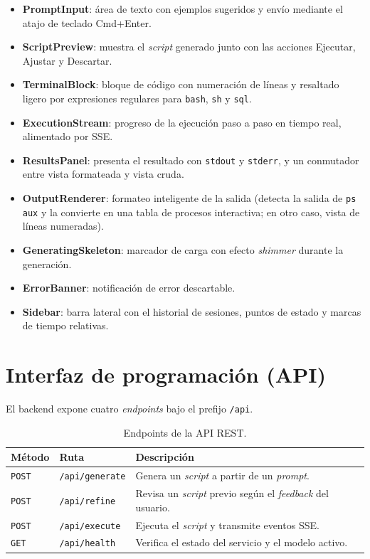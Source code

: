 \documentclass[12pt,a4paper]{article}
\begin{document}
\begin{itemize}
    \item \textbf{PromptInput}: área de texto con ejemplos sugeridos y envío
    mediante el atajo de teclado Cmd+Enter.
    \item \textbf{ScriptPreview}: muestra el \textit{script} generado junto con
    las acciones Ejecutar, Ajustar y Descartar.
    \item \textbf{TerminalBlock}: bloque de código con numeración de líneas y
    resaltado ligero por expresiones regulares para \texttt{bash}, \texttt{sh}
    y \texttt{sql}.
    \item \textbf{ExecutionStream}: progreso de la ejecución paso a paso en
    tiempo real, alimentado por SSE.
    \item \textbf{ResultsPanel}: presenta el resultado con \texttt{stdout} y
    \texttt{stderr}, y un conmutador entre vista formateada y vista cruda.
    \item \textbf{OutputRenderer}: formateo inteligente de la salida (detecta la
    salida de \texttt{ps aux} y la convierte en una tabla de procesos
    interactiva; en otro caso, vista de líneas numeradas).
    \item \textbf{GeneratingSkeleton}: marcador de carga con efecto
    \textit{shimmer} durante la generación.
    \item \textbf{ErrorBanner}: notificación de error descartable.
    \item \textbf{Sidebar}: barra lateral con el historial de sesiones, puntos
    de estado y marcas de tiempo relativas.
\end{itemize}

\section{Interfaz de programación (API)}

El backend expone cuatro \textit{endpoints} bajo el prefijo \texttt{/api}.

\begin{table}[H]
\centering
\caption{Endpoints de la API REST.}
\begin{tabularx}{\textwidth}{@{}l l X@{}}
\toprule
\textbf{Método} & \textbf{Ruta} & \textbf{Descripción} \\
\midrule
\texttt{POST} & \texttt{/api/generate} & Genera un \textit{script} a partir de un \textit{prompt}. \\
\texttt{POST} & \texttt{/api/refine}   & Revisa un \textit{script} previo según el \textit{feedback} del usuario. \\
\texttt{POST} & \texttt{/api/execute}  & Ejecuta el \textit{script} y transmite eventos SSE. \\
\texttt{GET}  & \texttt{/api/health}   & Verifica el estado del servicio y el modelo activo. \\
\bottomrule
\end{tabularx}
\end{table}
\end{document}
